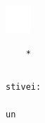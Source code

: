 \documentclass[10pt]{article}
\begin{document}
\includegraphics[max width=\textwidth, center]{2025_04_17_46e04c6acd873ea9558dg-021(5)}

\begin{verbatim}
    *
\end{verbatim}

\begin{verbatim}

\end{verbatim}

\begin{verbatim}
stivei:
                                                                                                                    un
\end{verbatim}
\end{document}
